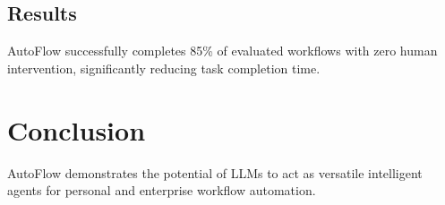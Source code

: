 \documentclass[sigconf]{acmart}
\begin{document}
\subsection{Results}
AutoFlow successfully completes 85\% of evaluated workflows with zero human intervention, significantly reducing task completion time.

\section{Conclusion}
AutoFlow demonstrates the potential of LLMs to act as versatile intelligent agents for personal and enterprise workflow automation. 


% 
\end{document}
